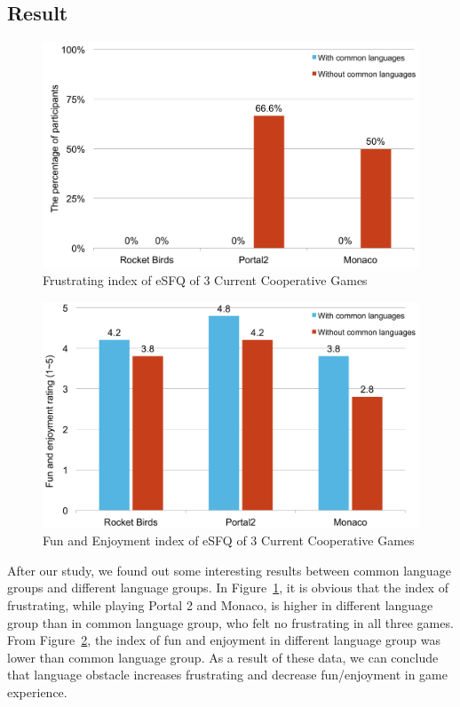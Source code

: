 \subsection{Result}

\begin{figure}[!h]
\centering
\includegraphics[width=0.9\columnwidth]{Figures/PS_Frus.pdf}
\caption{Frustrating index of eSFQ of 3 Current Cooperative Games}
\label{fig:PS_Frus}
\end{figure}

\begin{figure}[!h]
\centering
\includegraphics[width=0.9\columnwidth]{Figures/PS_FunAndEnj.pdf}
\caption{Fun and Enjoyment index of eSFQ of 3 Current Cooperative Games}
\label{fig:PS_FunAndEnj}
\end{figure}


After our study, we found out some interesting results between common language groups and different language groups. In Figure~\ref{fig:PS_Frus}, it is obvious that the index of frustrating, while playing Portal 2 and Monaco, is higher in different language group than in common language group, who felt no frustrating in all three games. From Figure~\ref{fig:PS_FunAndEnj}, the index of fun and enjoyment in different language group was lower than common language group. As a result of these data, we can conclude that language obstacle increases frustrating and decrease fun/enjoyment in game experience.


